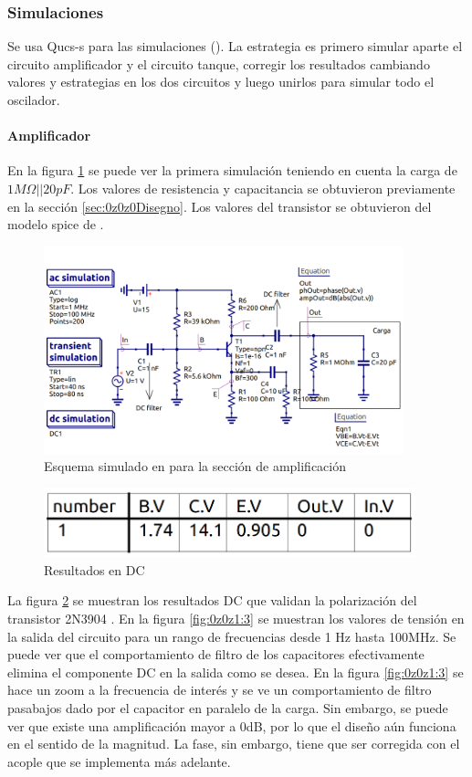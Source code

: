 \subsubsection{Simulaciones}\label{sec:0z0z1Simulation}
Se usa Qucs-s para las simulaciones (\cite{noauthor_qucs-s_nodate}). La estrategia es primero simular aparte el circuito amplificador y el circuito tanque, corregir los resultados cambiando valores y estrategias en los dos circuitos y luego unirlos para simular todo el oscilador. 
\paragraph{Amplificador}
En la figura \ref{fig:0z0z1:1} se puede ver la primera simulación teniendo en cuenta la carga de $1M\Omega || 20 pF$. Los valores de resistencia y capacitancia se obtuvieron previamente en la sección \ref{sec:0z0z0Disegno}. Los valores del transistor se obtuvieron del modelo spice de \cite{alldatasheetcom_2n3904_nodate}.

\begin{figure}
    \centering
    \includegraphics[height=6cm]{Images/13.png}
    \caption{Esquema simulado en \cite{noauthor_qucs-s_nodate} para la sección de amplificación}
    \label{fig:0z0z1:1}
\end{figure}
\begin{figure}
    \centering
    \includegraphics[height=2cm]{Images/5.png}
    \caption{Resultados en DC}
    \label{fig:0z0z1:2}
\end{figure}
La figura \ref{fig:0z0z1:2} se muestran los resultados DC que validan la polarización del transistor 2N3904 \cite{alldatasheetcom_2n3904_nodate}. En la figura \ref{fig:0z0z1:3} se muestran los valores de tensión en la salida del circuito para un rango de frecuencias desde 1 Hz hasta 100MHz. Se puede ver que el comportamiento de filtro de los capacitores efectivamente elimina el componente DC en la salida como se desea. En la figura \ref{fig:0z0z1:3} se hace un zoom a la frecuencia de interés y se ve un comportamiento de filtro pasabajos dado por el capacitor en paralelo de la carga. Sin embargo, se puede ver que existe una amplificación mayor a 0dB, por lo que el diseño aún funciona en el sentido de la magnitud. La fase, sin embargo, tiene que ser corregida con el acople que se implementa más adelante. 

